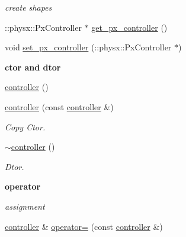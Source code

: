 \begin{DoxyCompactItemize}
\begin{DoxyCompactList}\small\item\em create shapes \item\end{DoxyCompactList}\item 
::physx::PxController $\ast$ \hyperlink{classnebula_1_1content_1_1actor_1_1physics_1_1physx_1_1controller_a67d2f490804b7182a7c377701d376529}{get\_\-px\_\-controller} ()
\item 
void \hyperlink{classnebula_1_1content_1_1actor_1_1physics_1_1physx_1_1controller_a47f42d3e89f26708f5f0b01aa317e5bd}{set\_\-px\_\-controller} (::physx::PxController $\ast$)
\end{DoxyCompactItemize}
\begin{Indent}{\bf ctor and dtor}\par
{\em \label{_amgrp98fbd3e5ae66fcd014fb744fec76c58d}
 }\begin{DoxyCompactItemize}
\item 
\hyperlink{classnebula_1_1content_1_1actor_1_1physics_1_1physx_1_1controller_ab20fc96e41d814af4bf236280d6017a2}{controller} ()
\item 
\hyperlink{classnebula_1_1content_1_1actor_1_1physics_1_1physx_1_1controller_a5051e958aee9bb1e72b2503c127a2b7c}{controller} (const \hyperlink{classnebula_1_1content_1_1actor_1_1physics_1_1physx_1_1controller}{controller} \&)
\begin{DoxyCompactList}\small\item\em Copy Ctor. \item\end{DoxyCompactList}\item 
\hyperlink{classnebula_1_1content_1_1actor_1_1physics_1_1physx_1_1controller_a5703a3258866685338b218c9fbc32c83}{$\sim$controller} ()
\begin{DoxyCompactList}\small\item\em Dtor. \item\end{DoxyCompactList}\end{DoxyCompactItemize}
\end{Indent}
\begin{Indent}{\bf operator}\par
{\em \label{_amgrp4b583376b2767b923c3e1da60d10de59}
 assignment }\begin{DoxyCompactItemize}
\item 
\hyperlink{classnebula_1_1content_1_1actor_1_1physics_1_1physx_1_1controller}{controller} \& \hyperlink{classnebula_1_1content_1_1actor_1_1physics_1_1physx_1_1controller_aaa5ea730edb5f50fc8786400375cae52}{operator=} (const \hyperlink{classnebula_1_1content_1_1actor_1_1physics_1_1physx_1_1controller}{controller} \&)
\end{DoxyCompactItemize}
\end{Indent}
